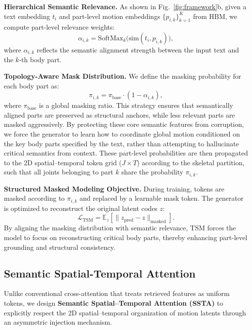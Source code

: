 \documentclass[10pt,journal,compsoc]{IEEEtran}
\newcommand{\myparagraph}[1]{\textbf{#1}\hspace{1.8ex}}
\begin{document}
\noindent \myparagraph{Hierarchical Semantic Relevance.}
As shown in Fig.~\ref{fig:framework}b, given a text embedding $t_i$ and part-level motion embeddings $\{p_{i,k}\}_{k=1}^{K}$ from HBM, we compute part-level relevance weights:
\begin{equation}
\alpha_{i,k}
=
\mathrm{SoftMax}_k
\big(
\mathrm{sim}(t_i, p_{i,k})
\big),
\end{equation}
where $\alpha_{i,k}$ reflects the semantic alignment strength between the input text and the $k$-th body part.


\noindent \myparagraph{Topology-Aware Mask Distribution.}
We define the masking probability for each body part as:
\begin{equation}
\pi_{i,k}
=
\pi_{\mathrm{base}}
\cdot
(1 - \alpha_{i,k}),
\end{equation}
where $\pi_{\mathrm{base}}$ is a global masking ratio. This strategy ensures that semantically aligned parts are preserved as structural anchors, while less relevant parts are masked aggressively. By protecting these core semantic features from corruption, we force the generator to learn how to coordinate global motion conditioned on the key body parts specified by the text, rather than attempting to hallucinate critical semantics from context. These part-level probabilities are then propagated to the 2D spatial--temporal token grid ($J \times T$) according to the skeletal partition, such that all joints belonging to part $k$ share the probability $\pi_{i,k}$.

\noindent \myparagraph{Structured Masked Modeling Objective.}
During training, tokens are masked according to $\pi_{i,k}$ and replaced by a learnable mask token. The generator is optimized to reconstruct the original latent codes $z$:
\begin{equation}
\mathcal{L}_{\mathrm{TSM}}
=
\mathbb{E}_{z}
\left[
\| z_{\mathrm{pred}} - z \|_{\mathrm{masked}}
\right].
\end{equation}
By aligning the masking distribution with semantic relevance, TSM forces the model to focus on reconstructing critical body parts, thereby enhancing part-level grounding and structural consistency.




\subsection{Semantic Spatial-Temporal Attention}
\label{subsec:ssta}
Unlike conventional cross-attention that treats retrieved features as uniform tokens, we design \textbf{Semantic Spatial--Temporal Attention (SSTA)} to explicitly respect the 2D spatial–temporal organization of motion latents through an asymmetric injection mechanism.
\end{document}
